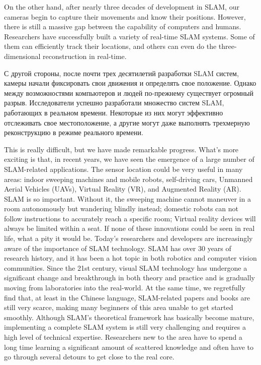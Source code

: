 \begin{English}
    On the other hand, after nearly three decades of development in SLAM, our cameras begin to capture their movements and know their positions. However, there is still a massive gap between the capability of computers and humans. Researchers have successfully built a variety of real-time SLAM systems. Some of them can efficiently track their locations, and others can even do the three-dimensional reconstruction in real-time.    
\end{English}

\begin{Russian}
    С другой стороны, после почти трех десятилетий разработки SLAM систем, камеры начали фиксировать свои движения и определять свое положение. Однако между возможностями компьютеров и людей по-прежнему существует огромный разрыв. Исследователи успешно разработали множество систем SLAM, работающих в реальном времени. Некоторые из них могут эффективно отслеживать свое местоположение, а другие могут даже выполнять трехмерную реконструкцию в режиме реального времени.
\end{Russian}

\begin{English}
    This is really difficult, but we have made remarkable progress. What's more exciting is that, in recent years, we have seen the emergence of a large number of SLAM-related applications. The sensor location could be very useful in many areas: indoor sweeping machines and mobile robots, self-driving cars, Unmanned Aerial Vehicles (UAVs), Virtual Reality (VR), and Augmented Reality (AR). SLAM is so important. Without it, the sweeping machine cannot maneuver in a room autonomously but wandering blindly instead; domestic robots can not follow instructions to accurately reach a specific room; Virtual reality devices will always be limited within a seat. If none of these innovations could be seen in real life, what a pity it would be.
    Today's researchers and developers are increasingly aware of the importance of SLAM technology. SLAM has over 30 years of research history, and it has been a hot topic in both robotics and computer vision communities. Since the 21st century, visual SLAM technology has undergone a significant change and breakthrough in both theory and practice and is gradually moving from laboratories into the real-world. At the same time, we regretfully find that, at least in the Chinese language, SLAM-related papers and books are still very scarce, making many beginners of this area unable to get started smoothly. Although SLAM's theoretical framework has basically become mature, implementing a complete SLAM system is still very challenging and requires a high level of technical expertise. Researchers new to the area have to spend a long time learning a significant amount of scattered knowledge and often have to go through several detours to get close to the real core.

\end{English}

